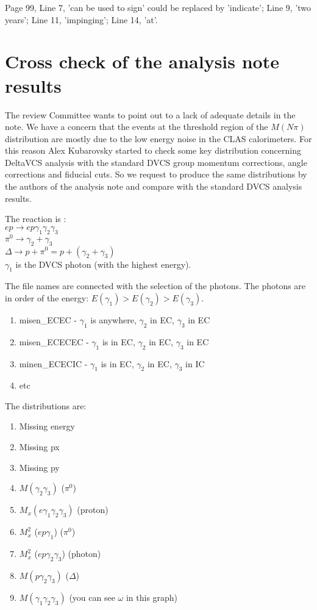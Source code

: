 \documentclass[11pt]{paper}
\begin{document}
Page 99, Line 7, 'can be used to sign' could be replaced by 'indicate'; Line 9, 'two years'; Line 11, 'impinging'; Line 14, 'at'.

\section*{Cross check of the analysis note results}

The review Committee wants to point out to
a lack of adequate details in the note. We have a concern that the events
at the threshold region of the $M(N\pi)$  distribution are mostly due to the low energy noise 
in the CLAS calorimeters.
For this reason  Alex Kubarovsky started to check some key distribution concerning
DeltaVCS analysis with the standard DVCS group momentum corrections, angle corrections and fiducial cuts. So we request to produce the same distributions by the authors of the analysis note  and compare with the 
standard DVCS analysis results.

The reaction is : \\
$ep \to e p \gamma_1 \gamma_2 \gamma_3$ \\
$\pi^0 \to  \gamma_2+\gamma_3 $  \\
$\Delta  \to p+\pi^0=p+(\gamma_2+\gamma_3) $\\
$\gamma_1$ is the DVCS photon (with the highest energy).


The file names are connected with the selection of the photons.
The photons are in order of the energy: $E(\gamma_1)>E(\gamma_2)>E(\gamma_3)$.
\begin{enumerate}
\item misen\_ECEC       - $\gamma_1$ is anywhere,  $\gamma_2$ in EC, $\gamma_3$ in EC
\item misen\_ECECEC  -  $\gamma_1$ is in EC,  $\gamma_2$ in EC, $\gamma_3$ in EC
\item minen\_ECECIC   -  $\gamma_1$ is in EC,  $\gamma_2$ in EC, $\gamma_3$ in IC
\item etc
\end{enumerate}

The distributions are:
\begin{enumerate}
\item Missing energy
\item Missing px
\item Missing py
\item $M(\gamma_2 \gamma_3)$   ($\pi^0$)
\item $M_x(e\gamma_1\gamma_2\gamma_3)$  (proton)
\item $M^2_x$ ($ep\gamma_1$)  ($\pi^0$)
\item $M^2_x$ ($ep\gamma_2\gamma_3$) (photon)
\item $M(p\gamma_2\gamma_3)$ ($\Delta$)
\item $M(\gamma_1\gamma_2\gamma_3)$ (you can see $\omega$ in this graph)
\end{enumerate}
\end{document}
